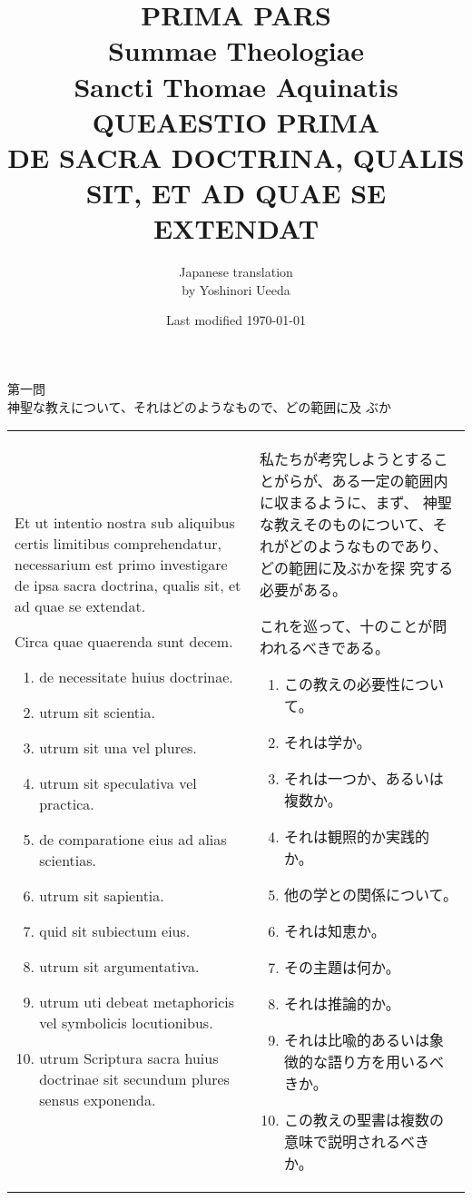 \documentclass[10pt]{jsarticle}
\title{{\bf PRIMA PARS}\\{\HUGE Summae Theologiae}\\Sancti Thomae
Aquinatis\\{\sffamily QUEAESTIO PRIMA}\\DE SACRA DOCTRINA, QUALIS SIT,
ET AD QUAE SE EXTENDAT}
\author{Japanese translation\\by Yoshinori {\sc Ueeda}}
\date{Last modified \today}
\begin{document}
\maketitle
\pagestyle{fancy}

\begin{center}
{\Large 第一問\\神聖な教えについて、それはどのようなもので、どの範囲に及
 ぶか}
\end{center}

\begin{longtable}{p{21em}p{21em}}

Et ut intentio nostra sub aliquibus certis limitibus comprehendatur,
 necessarium est primo investigare de ipsa sacra doctrina, qualis sit,
 et ad quae se extendat. 

Circa quae quaerenda sunt decem. 

\begin{enumerate}
 \item de necessitate huius doctrinae.
 \item utrum sit scientia.
 \item utrum sit una vel plures.
 \item utrum sit speculativa vel practica.
 \item de comparatione eius ad alias scientias.
 \item utrum sit sapientia.
 \item quid sit subiectum eius. 
 \item utrum sit argumentativa.
 \item utrum uti debeat metaphoricis vel symbolicis locutionibus.
 \item utrum Scriptura sacra huius doctrinae sit secundum plures sensus exponenda.

\end{enumerate}

&

私たちが考究しようとすることがらが、ある一定の範囲内に収まるように、まず、
 神聖な教えそのものについて、それがどのようなものであり、どの範囲に及ぶかを探
 究する必要がある。

これを巡って、十のことが問われるべきである。

\begin{enumerate}
 \item この教えの必要性について。
 \item それは学か。
 \item それは一つか、あるいは複数か。
 \item それは観照的か実践的か。
 \item 他の学との関係について。
 \item それは知恵か。
 \item その主題は何か。
 \item それは推論的か。
 \item それは比喩的あるいは象徴的な語り方を用いるべきか。
 \item この教えの聖書は複数の意味で説明されるべきか。
\end{enumerate}

\\

\end{longtable}
\end{document}
